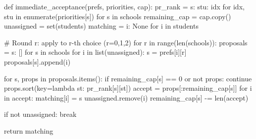 def immediate_acceptance(prefs, priorities, cap):
    pr_rank = {s: {stu: idx for idx, stu in enumerate(priorities[s])} for s in schools}
    remaining_cap = cap.copy()
    unassigned = set(students)
    matching = {i: None for i in students}

    # Round r: apply to r-th choice (r=0,1,2)
    for r in range(len(schools)):
        proposals = {s: [] for s in schools}
        for i in list(unassigned):
            s = prefs[i][r]
            proposals[s].append(i)

        for s, props in proposals.items():
            if remaining_cap[s] == 0 or not props:
                continue
            props.sort(key=lambda st: pr_rank[s][st])
            accept = props[:remaining_cap[s]]
            for i in accept:
                matching[i] = s
                unassigned.remove(i)
            remaining_cap[s] -= len(accept)

        if not unassigned:
            break

    return matching